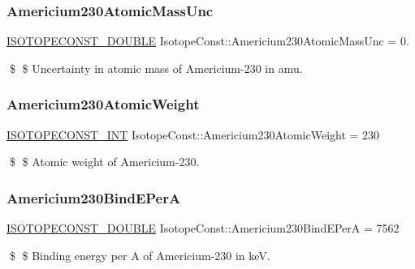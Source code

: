 \subsubsection{\texorpdfstring{Americium230\+Atomic\+Mass\+Unc}{Americium230AtomicMassUnc}}
{\footnotesize\ttfamily \mbox{\hyperlink{group___isotope_const-_macros_ga8f45a7272ce02c0b4c65c44636ed719a}{I\+S\+O\+T\+O\+P\+E\+C\+O\+N\+S\+T\+\_\+\+D\+O\+U\+B\+LE}} Isotope\+Const\+::\+Americium230\+Atomic\+Mass\+Unc = 0.}

\$ \$ Uncertainty in atomic mass of Americium-\/230 in amu. \mbox{\label{group___isotope_const-_americium-_am230_ga20e4ea0504f21fb21fbbefb5e35e86b9}} 
\subsubsection{\texorpdfstring{Americium230\+Atomic\+Weight}{Americium230AtomicWeight}}
{\footnotesize\ttfamily \mbox{\hyperlink{group___isotope_const-_macros_ga5f18360b3e99483a35c32d789e62621c}{I\+S\+O\+T\+O\+P\+E\+C\+O\+N\+S\+T\+\_\+\+I\+NT}} Isotope\+Const\+::\+Americium230\+Atomic\+Weight = 230}

\$ \$ Atomic weight of Americium-\/230. \mbox{\label{group___isotope_const-_americium-_am230_ga530f85c619d584f6573ef76eebf73960}} 
\subsubsection{\texorpdfstring{Americium230\+Bind\+E\+PerA}{Americium230BindEPerA}}
{\footnotesize\ttfamily \mbox{\hyperlink{group___isotope_const-_macros_ga8f45a7272ce02c0b4c65c44636ed719a}{I\+S\+O\+T\+O\+P\+E\+C\+O\+N\+S\+T\+\_\+\+D\+O\+U\+B\+LE}} Isotope\+Const\+::\+Americium230\+Bind\+E\+PerA = 7562}

\$ \$ Binding energy per A of Americium-\/230 in keV. \mbox{\label{group___isotope_const-_americium-_am230_gafda9f33ae4a0af129bb4cdbe074f6c0a}} 
